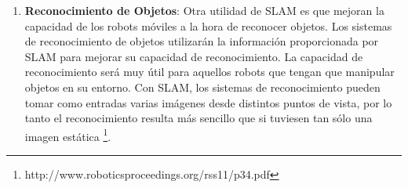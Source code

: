 \begin {enumerate}
\begin{figure}[H]
\begin{center}
\hspace{0.5cm}
\end{center}
\caption{El cinturón con cámaras estéreo (a) La capacidad de carga del robot Gita (b)}
\label{fig:gita}
\end{figure}


\item \textbf{Reconocimiento de Objetos}: Otra utilidad de SLAM es que mejoran la capacidad de los robots móviles a la hora de reconocer objetos. Los sistemas de reconocimiento de objetos utilizarán la información proporcionada por SLAM para mejorar su capacidad de reconocimiento. La capacidad de reconocimiento será muy útil para aquellos robots que tengan que manipular objetos en su entorno. Con SLAM, los sistemas de reconocimiento pueden tomar como entradas varias imágenes desde distintos puntos de vista, por lo tanto el reconocimiento resulta más sencillo que si tuviesen tan sólo una imagen estática \footnote{http://www.roboticsproceedings.org/rss11/p34.pdf}.


\end{enumerate}
